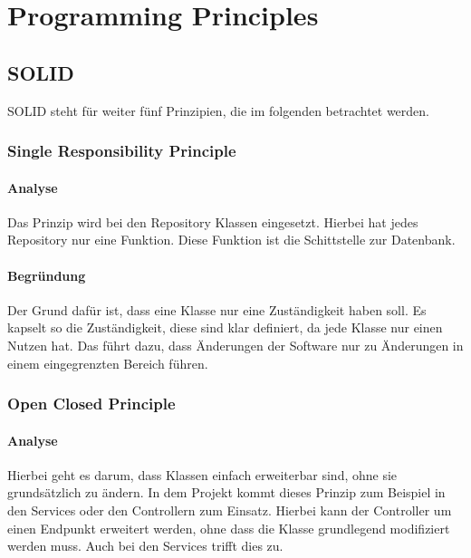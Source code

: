 
\chapter{Programming Principles}

\section{SOLID}
SOLID steht für weiter fünf Prinzipien, die im folgenden betrachtet werden.

    \subsection{Single Responsibility Principle}
    
        \subsubsection{Analyse}
        Das Prinzip wird bei den Repository Klassen eingesetzt. Hierbei hat jedes Repository nur eine Funktion. Diese Funktion ist die Schittstelle zur Datenbank.
        
        \subsubsection{Begründung}
        Der Grund dafür ist, dass eine Klasse nur eine Zuständigkeit haben soll. Es kapselt so die Zuständigkeit, diese sind klar definiert, da jede Klasse nur einen Nutzen hat. Das führt dazu, dass Änderungen der Software nur zu Änderungen in einem eingegrenzten Bereich führen.

    \subsection{Open Closed Principle}
    
        \subsubsection{Analyse}
        Hierbei geht es darum, dass Klassen einfach erweiterbar sind, ohne sie grundsätzlich zu ändern. In dem Projekt kommt dieses Prinzip zum Beispiel in den Services oder den Controllern zum Einsatz. Hierbei kann der Controller um einen Endpunkt erweitert werden, ohne dass die Klasse grundlegend modifiziert werden muss. Auch bei den Services trifft dies zu.
        
